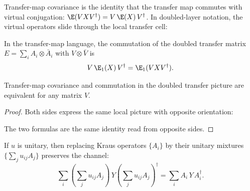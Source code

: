 \begin{definition}\label{def:condC2}
    \leanok
    Transfer-map covariance is the identity that the transfer map commutes with virtual
    conjugation: $\E(V X V^\dagger) = V\, \E(X)\, V^\dagger$.
    In doubled-layer notation, the virtual operators slide through the local
    transfer cell:
    \begin{center}
    \end{center}
\end{definition}

\begin{definition}\label{def:condC3}
    \leanok
    In the transfer-map language, the commutation of the doubled transfer matrix
    $E = \sum_i A_i \otimes \bar A_i$ with $V \otimes \bar V$ is
    \[
        V\, \E_1(X)\, V^\dagger = \E_1(V X V^\dagger).
    \]
\end{definition}

\begin{theorem}%
    \label{thm:condC2_iff_condC3}
    \leanok
    Transfer-map covariance and commutation in the doubled transfer
    picture are equivalent for any matrix $V$.
\end{theorem}

\begin{proof}
    \leanok
    Both sides express the same local picture with opposite orientation:
    \begin{center}
    \end{center}
    The two formulas are the same identity read from opposite sides.
\end{proof}

\begin{lemma}\label{lem:unitary_kraus_mixing}
    \leanok
    If $u$ is unitary, then replacing Kraus operators $\{A_i\}$ by
    their unitary mixtures $\{\sum_j u_{ij} A_j\}$ preserves the
    channel:
    \[
        \sum_i \left(\sum_j u_{ij} A_j\right)\, Y
        \left(\sum_j u_{ij} A_j\right)^\dagger
        =
        \sum_i A_i\, Y\, A_i^\dagger.
    \]
\end{lemma}

